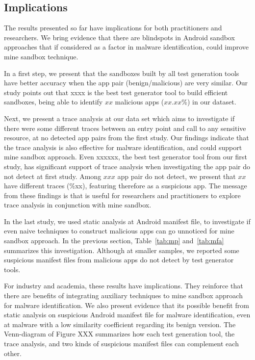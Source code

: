 \subsection{Implications}\label{sec:implications}

The results presented so far have implications for both practitioners and researchers. We bring evidence that there are blindspots in Android sandbox approaches that if considered as a factor in malware identification, could improve mine sandbox technique. 

In a first step, we present that the sandboxes built by all test generation tools have better accuracy when the app pair (benign/malicious) are very similar. Our study points out that xxxx is the best test generator tool to build efficient sandboxes, being able to identify $xx$ malicious apps ($xx.xx$\%) in our dataset.

Next, we present a trace analysis at our data set which aims to investigate if there were some different traces between an entry point and call to any sensitive resource, at no detected app pairs from the first study. Our findings indicate that the trace analysis is also effective for malware identification, and could support mine sandbox approach. Even xxxxxx, the best test generator tool from our first study, has significant support of trace analysis when investigating the app pair do not detect at first study. Among $xxx$ app pair do not detect, we present that $xx$ have different traces (\%xx), featuring therefore as a suspicious app. The message from these findings is that is useful for researchers and practitioners to explore trace analysis in conjunction with mine sandbox.

In the last study, we used static analysis at Android manifest file, to investigate if even naive techniques to construct malicious apps can go unnoticed for mine sandbox approach. In the previous section, Table~\ref{tab:mp} and~\ref{tab:mfa} summarizes this investigation. Although at smaller samples, we reported some suspicious manifest files from malicious apps do not detect by test generator tools.

For industry and academia, these results have implications. They reinforce that there are benefits of integrating auxiliary techniques to mine sandbox approach for malware identification. We also present evidence that its possible benefit from static analysis on suspicious Android manifest file for malware identification, even at malware with a low similarity coefficient regarding its benign version. The Venn-diagram of Figure XXX summarizes how each test generation tool, the trace analysis, and two kinds of suspicious manifest files can complement each other.
